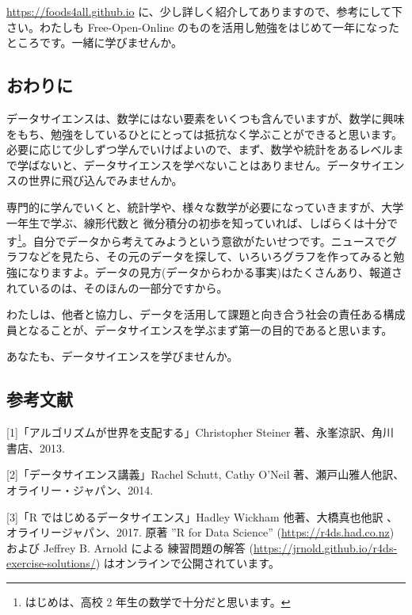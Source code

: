 \documentclass[
]{bxjsbook}
\theoremstyle{definition}
\theoremstyle{definition}
\theoremstyle{definition}
\theoremstyle{definition}
\theoremstyle{remark}
\begin{document}
\url{https://foods4all.github.io} に、少し詳しく紹介してありますので、参考にして下さい。わたしも Free-Open-Online のものを活用し勉強をはじめて一年になったところです。一緒に学びませんか。

\hypertarget{ux304aux308fux308aux306b-1}{%
\subsection{おわりに}\label{ux304aux308fux308aux306b-1}}

データサイエンスは、数学にはない要素をいくつも含んでいますが、数学に興味をもち、勉強をしているひとにとっては抵抗なく学ぶことができると思います。必要に応じて少しずつ学んでいけばよいので、まず、数学や統計をあるレベルまで学ばないと、データサイエンスを学べないことはありません。データサイエンスの世界に飛び込んでみませんか。

専門的に学んでいくと、統計学や、様々な数学が必要になっていきますが、大学一年生で学ぶ、線形代数と 微分積分の初歩を知っていれば、しばらくは十分です\footnote{はじめは、高校 2 年生の数学で十分だと思います。}。自分でデータから考えてみようという意欲がたいせつです。ニュースでグラフなどを見たら、その元のデータを探して、いろいろグラフを作ってみると勉強になりますよ。データの見方(データからわかる事実)はたくさんあり、報道されているのは、そのほんの一部分ですから。

わたしは、他者と協力し、データを活用して課題と向き合う社会の責任ある構成員となることが、データサイエンスを学ぶまず第一の目的であると思います。

あなたも、データサイエンスを学びませんか。

\hypertarget{ux53c2ux8003ux6587ux732e}{%
\subsection*{参考文献}\label{ux53c2ux8003ux6587ux732e}}

{[}1{]}「アルゴリズムが世界を支配する」Christopher Steiner 著、永峯涼訳、角川 書店、2013.

{[}2{]}「データサイエンス講義」Rachel Schutt, Cathy O'Neil 著、瀬戸山雅人他訳、オライリー・ジャパン、2014.

{[}3{]}「R ではじめるデータサイエンス」Hadley Wickham 他著、大橋真也他訳 、オライリージャパン、2017. 原著 ''R for Data Science'' (\url{https://r4ds.had.co.nz}) および Jeffrey B. Arnold による 練習問題の解答
(\url{https://jrnold.github.io/r4ds-exercise-solutions/}) はオンラインで公開されています。
\end{document}
